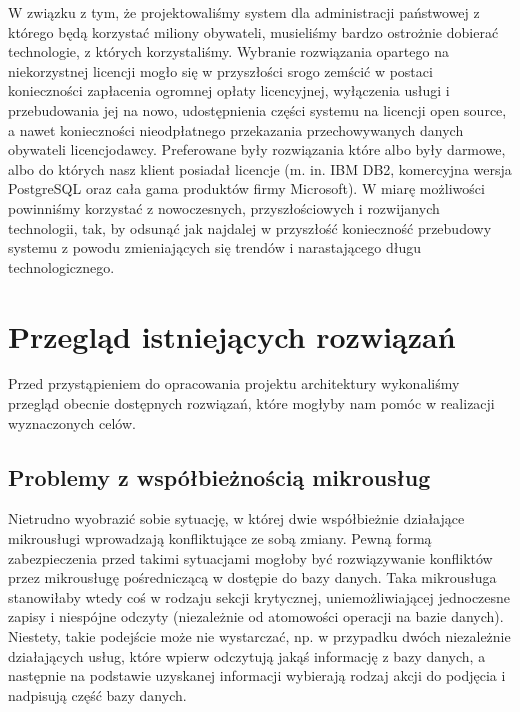 \documentclass[licencjacka]{pracamgr}
\begin{document}
W związku z tym, że projektowaliśmy system dla administracji państwowej z którego będą korzystać miliony obywateli,
musieliśmy bardzo ostrożnie dobierać technologie, z których korzystaliśmy. Wybranie rozwiązania opartego na
niekorzystnej licencji mogło się w przyszłości srogo zemścić w postaci konieczności zapłacenia ogromnej opłaty
licencyjnej, wyłączenia usługi i przebudowania jej na nowo, udostępnienia części systemu na licencji open source, a
nawet konieczności nieodpłatnego przekazania przechowywanych danych obywateli licencjodawcy. Preferowane były
rozwiązania które albo były darmowe, albo do których nasz klient posiadał licencje (m. in. IBM DB2, komercyjna wersja PostgreSQL oraz cała gama produktów firmy Microsoft). W miarę możliwości
powinniśmy korzystać z nowoczesnych, przyszłościowych i rozwijanych technologii, tak, by odsunąć jak najdalej w
przyszłość konieczność przebudowy systemu z powodu zmieniających się trendów i narastającego długu technologicznego.


\chapter{Przegląd istniejących rozwiązań}\label{r:przeglad}

Przed przystąpieniem do opracowania projektu architektury wykonaliśmy przegląd obecnie dostępnych rozwiązań, które
mogłyby nam pomóc w realizacji wyznaczonych celów.

\section{Problemy z współbieżnością mikrousług}

Nietrudno wyobrazić sobie sytuację, w której dwie współbieżnie działające mikrousługi
wprowadzają konfliktujące ze sobą zmiany. Pewną formą zabezpieczenia przed takimi sytuacjami
mogłoby być rozwiązywanie konfliktów przez mikrousługę pośredniczącą w dostępie do bazy danych.
Taka mikrousługa stanowiłaby wtedy coś w rodzaju sekcji krytycznej, uniemożliwiającej jednoczesne zapisy
i niespójne odczyty (niezależnie od atomowości operacji na bazie danych). 
Niestety, takie podejście może nie wystarczać, np. w przypadku dwóch niezależnie działających usług, które wpierw
odczytują jakąś informację z bazy danych, a następnie na podstawie uzyskanej informacji wybierają rodzaj
akcji do podjęcia i nadpisują część bazy danych.
\end{document}
